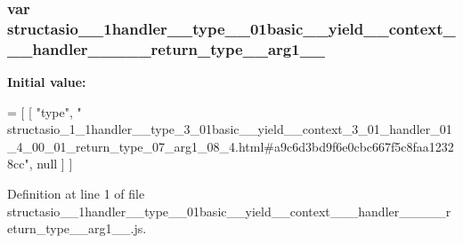 \subsubsection[{structasio\+\_\+1\+\_\+1handler\+\_\+\+\_\+type\+\_\+3\+\_\+01basic\+\_\+\+\_\+yield\+\_\+\+\_\+context\+\_\+3\+\_\+01\+\_\+handler\+\_\+01\+\_\+4\+\_\+00\+\_\+01\+\_\+return\+\_\+type\+\_\+07\+\_\+arg1\+\_\+08\+\_\+4}]{\setlength{\rightskip}{0pt plus 5cm}var structasio\+\_\+\_\+1handler\+\_\+\+\_\+type\+\_\+\_\+01basic\+\_\+\+\_\+yield\+\_\+\+\_\+context\+\_\+\_\+\_\+handler\+\_\+\_\+\_\+\_\+\_\+return\+\_\+type\+\_\+\_\+arg1\+\_\+\_}\label{structasio__1__1handler____type__3__01basic____yield____context__3__01__handler__01__4__00__01__d198685a7a8ac1b4ca90620e2e3142fa_a72d9b1b4f36bbebf2112ad44bb002327}
{\bfseries Initial value\+:}
\begin{DoxyCode}
=
[
    [ \textcolor{stringliteral}{"type"}, \textcolor{stringliteral}{"
      structasio\_1\_1handler\_\_type\_3\_01basic\_\_yield\_\_context\_3\_01\_handler\_01\_4\_00\_01\_return\_type\_07\_arg1\_08\_4.html#a9c6d3bd9f6e0cbc667f5c8faa12328cc"}, null ]
]
\end{DoxyCode}


Definition at line 1 of file structasio\+\_\+\_\+1handler\+\_\+\+\_\+type\+\_\+\_\+01basic\+\_\+\+\_\+yield\+\_\+\+\_\+context\+\_\+\_\+\_\+handler\+\_\+\_\+\_\+\_\+\_\+return\+\_\+type\+\_\+\_\+arg1\+\_\+\_.\+js.

